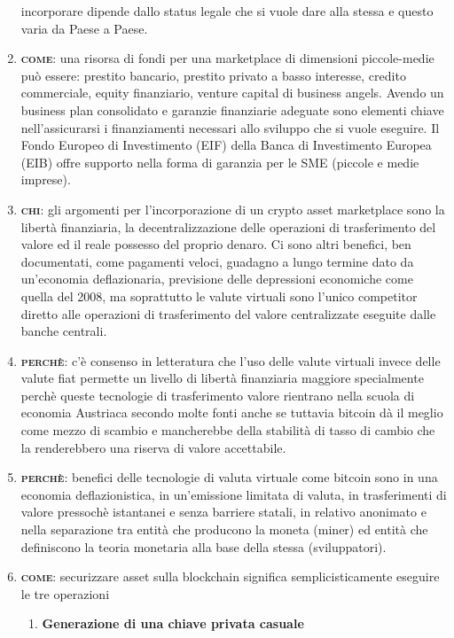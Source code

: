 \begin{enumerate}
	incorporare dipende dallo status legale che si vuole dare alla stessa e questo varia da Paese a Paese.		
	\item \textbf{\textsc{come}}: una risorsa di fondi per una marketplace di dimensioni piccole-medie può essere: prestito bancario,
	prestito privato a basso interesse, credito commerciale, equity finanziario, venture capital di business angels. Avendo un
	business plan consolidato e garanzie finanziarie adeguate sono elementi chiave nell'assicurarsi i finanziamenti necessari
	allo sviluppo che si vuole eseguire. Il Fondo Europeo di Investimento (EIF) della Banca di Investimento Europea (EIB)
	offre supporto nella forma di garanzia per le SME (piccole e medie imprese).
	\item \textbf{\textsc{chi}}: gli argomenti per l'incorporazione di un crypto asset marketplace sono la libertà finanziaria, la
	decentralizzazione delle operazioni di trasferimento del valore ed il reale possesso del proprio denaro.
	Ci sono altri benefici, ben documentati, come pagamenti veloci, guadagno a lungo termine dato da un'economia deflazionaria, previsione
	delle depressioni economiche come quella del 2008, ma soprattutto le valute virtuali sono l'unico competitor diretto alle operazioni
	di trasferimento del valore centralizzate eseguite dalle banche centrali.
	\item \textbf{\textsc{perchè}}: c'è consenso in letteratura che l'uso delle valute virtuali invece delle valute fiat permette un livello di
	libertà finanziaria maggiore specialmente perchè queste tecnologie di trasferimento valore rientrano nella scuola
	di economia Austriaca \cite{austrianTheory} secondo molte fonti \cite{misesItalia} anche se tuttavia bitcoin dà il meglio come
	mezzo di scambio e mancherebbe della stabilità di tasso di cambio che la renderebbero una riserva di valore accettabile.
	\item \textbf{\textsc{perchè}}: benefici delle tecnologie di valuta virtuale come bitcoin sono in una economia deflazionistica,
	in un'emissione limitata di valuta, in trasferimenti di valore pressochè istantanei e senza barriere statali, in 
	relativo anonimato e nella separazione tra entità che producono la moneta (miner) ed entità che definiscono la teoria monetaria
	alla base della stessa (sviluppatori).
	\item \textbf{\textsc{come}}: securizzare asset sulla blockchain significa semplicisticamente eseguire le tre operazioni
		\begin{enumerate}[label*=\arabic*.]
			\item \textbf{Generazione di una chiave privata casuale}

\end{enumerate}
\end{enumerate}
